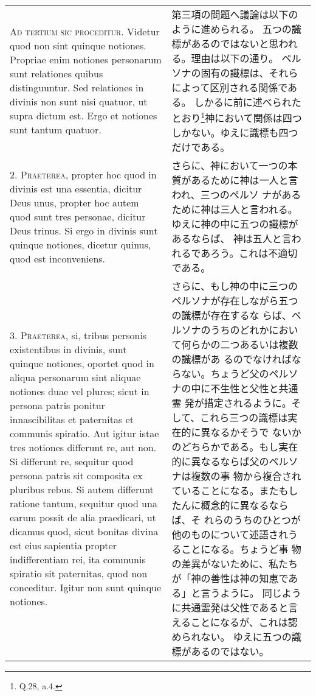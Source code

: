 \documentclass[10pt]{jsarticle} %
\begin{document}
\begin{longtable}{p{21em}p{21em}}

{\scshape Ad tertium sic proceditur}. Videtur quod non sint quinque
notiones. Propriae enim notiones personarum sunt relationes quibus
distinguuntur. Sed relationes in divinis non sunt nisi quatuor, ut
supra dictum est. Ergo et notiones sunt tantum quatuor.

&

第三項の問題へ議論は以下のように進められる。
五つの識標があるのではないと思われる。理由は以下の通り。
ペルソナの固有の識標は、それらによって区別される関係である。
しかるに前に述べられたとおり\footnote{Q.28, a.4.}神において関係は四つ
しかない。ゆえに識標も四つだけである。

\\



2. {\scshape Praeterea}, propter hoc quod in divinis est una essentia, dicitur Deus
unus, propter hoc autem quod sunt tres personae, dicitur Deus
trinus. Si ergo in divinis sunt quinque notiones, dicetur quinus, quod
est inconveniens.

&

さらに、神において一つの本質があるために神は一人と言われ、三つのペルソ
ナがあるために神は三人と言われる。ゆえに神の中に五つの識標があるならば、
神は五人と言われるであろう。これは不適切である。


\\



3. {\scshape Praeterea}, si, tribus personis existentibus in divinis, sunt quinque
notiones, oportet quod in aliqua personarum sint aliquae notiones duae
vel plures; sicut in persona patris ponitur innascibilitas et
paternitas et communis spiratio. Aut igitur istae tres notiones
differunt re, aut non. Si differunt re, sequitur quod persona patris
sit composita ex pluribus rebus. Si autem differunt ratione tantum,
sequitur quod una earum possit de alia praedicari, ut dicamus quod,
sicut bonitas divina est eius sapientia propter indifferentiam rei,
ita communis spiratio sit paternitas, quod non conceditur. Igitur non
sunt quinque notiones.

&

さらに、もし神の中に三つのペルソナが存在しながら五つの識標が存在するな
らば、ペルソナのうちのどれかにおいて何らかの二つあるいは複数の識標があ
るのでなければならない。ちょうど父のペルソナの中に不生性と父性と共通霊
発が措定されるように。そして、これら三つの識標は実在的に異なるかそうで
ないかのどちらかである。もし実在的に異なるならば父のペルソナは複数の事
物から複合されていることになる。またもしたんに概念的に異なるならば、そ
れらのうちのひとつが他のものについて述語されうることになる。ちょうど事
物の差異がないために、私たちが「神の善性は神の知恵である」と言うように。
同じように共通霊発は父性であると言えることになるが、これは認められない。
ゆえに五つの識標があるのではない。


\end{longtable}
\end{document}
